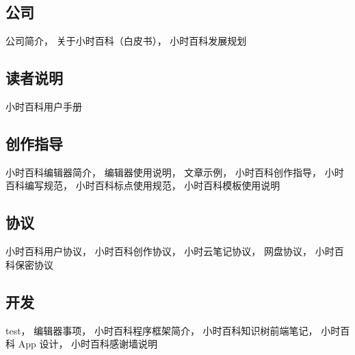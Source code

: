
\subsection{公司}
公司简介，
关于小时百科（白皮书），
小时百科发展规划

\subsection{读者说明}
小时百科用户手册

\subsection{创作指导}
小时百科编辑器简介，
编辑器使用说明，
文章示例，
小时百科创作指导，
小时百科编写规范，
小时百科标点使用规范，
小时百科模板使用说明

\subsection{协议}
小时百科用户协议，
小时百科创作协议，
小时云笔记协议，
网盘协议，
小时百科保密协议

\subsection{开发}
test，
编辑器事项，
小时百科程序框架简介，
小时百科知识树前端笔记，
小时百科 App 设计，
小时百科感谢墙说明
